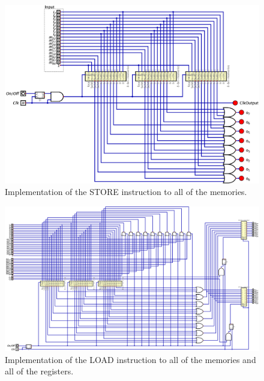 \documentclass[conference]{IEEEtran}
\begin{document}
\begin{figure}[h!]
    \centering
    \includegraphics[width=\textwidth]{assets/store.png}
    \caption{Implementation of the STORE instruction to all of the memories.}
    \label{fig:store_3memories}
\end{figure}

\begin{figure}[h!]
    \centering
    \includegraphics[width=\textwidth]{assets/load+store+3+2.png}
    \caption{Implementation of the LOAD instruction to all of the memories and all of the registers.}
    \label{fig:load+store+3+2}
\end{figure}
\end{document}
